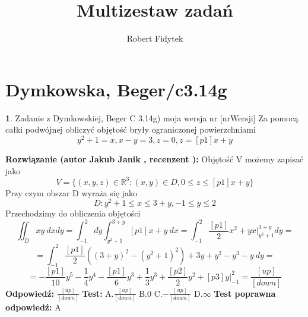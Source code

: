 \documentclass[12pt, a4paper]{article}
\title{Multizestaw zadań}
\author{Robert Fidytek}
\date{}
\theoremstyle{definition} %
\newtheorem{zad}{}
\newcommand{\kategoria}[1]{\section{#1}} %
\newcommand{\zadStart}[1]{\begin{zad}#1\newline} %
\newcommand{\zadStop}{\end{zad}}   %
\newcommand{\rozwStart}[2]{\noindent \textbf{Rozwiązanie (autor #1 , recenzent #2): }\newline} %
\newcommand{\rozwStop}{\newline}                                            %
\newcommand{\odpStart}{\noindent \textbf{Odpowiedź:}\newline}    %
\newcommand{\odpStop}{\newline}                                             %
\newcommand{\testStart}{\noindent \textbf{Test:}\newline} %
\newcommand{\testStop}{\newline} %
\newcommand{\kluczStart}{\noindent \textbf{Test poprawna odpowiedź:}\newline} %
\newcommand{\kluczStop}{\newline} %
\begin{document}
\maketitle


\kategoria{Dymkowska, Beger/c3.14g}
\zadStart{Zadanie z Dymkowskiej, Beger C 3.14g) moja wersja nr [nrWersji]}
Za pomocą całki podwójnej obliczyć objętość bryły ograniczonej powierzchniami $$y^2+1=x, x-y=3, z=0, z=[p1]x+y$$
\zadStop
\rozwStart{Jakub Janik}{}
Objętość V możemy zapisać jako
$$V=\{(x,y,z)\in\mathbb{R}^3\colon(x,y)\in D, 0 \leq z \leq [p1]x+y\}$$
Przy czym obszar D wyraża się jako
$$D\colon y^2+1 \leq x \leq 3+y, -1 \leq y \leq 2$$
Przechodzimy do obliczenia objętości
$$\iint_D xy\ dxdy=\int_{-1}^2dy\int_{y^2+1}^{3+y}[p1]x+y\ dx=\int_{-1}^2\frac{[p1]}{2}x^2+yx\Big|_{y^2+1}^{3+y}dy=$$
$$=\int_{-1}^2\frac{[p1]}{2}((3+y)^2-(y^2+1)^2)+3y+y^2-y^3-y\ dy=$$
$$=-\frac{[p1]}{10}y^5-\frac{1}{4}y^4-\frac{[p1]}{6}y^3+\frac{1}{3}y^3+\frac{[p2]}{2}y^2+[p3]y\Big|_{-1}^2=\frac{[up]}{[down]}$$
\rozwStop
\odpStart
$\frac{[up]}{[down]}$
\odpStop
\testStart
A.$\frac{[up]}{[down]}$
B.$0$
C.$-\frac{[up]}{[down]}$
D.$\infty$
\testStop
\kluczStart
A
\kluczStop
\end{document}
